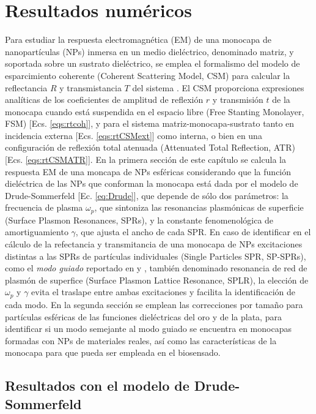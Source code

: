 \chapter{Resultados numéricos}
\label{chapter:Resultados}

Para estudiar la respuesta electromagnética (EM) de una monocapa de nanopartículas (NPs) inmersa en un medio dieléctrico, denominado matriz, y soportada sobre un sustrato dieléctrico, se emplea el formalismo del modelo de esparcimiento coherente (Coherent Scattering Model, CSM) para calcular la reflectancia $R$ y transmistancia $T$ del sistema \cite{reyes2018analytical}. El CSM proporciona expresiones analíticas de los coeficientes de amplitud de reflexión $r$ y transmisión $t$ de la monocapa cuando está suspendida en el espacio libre (Free Stanting Monolayer, FSM) [Ecs. \eqref{eqs:rtcoh}], y para el sistema matriz-monocapa-sustrato tanto en incidencia externa [Ecs. \eqref{eqs:rtCSMext}] como interna, o bien en una configuración de reflexión total atenuada  (Attenuated Total Reflection, ATR) [Ecs. \eqref{eqs:rtCSMATR}]. En la primera sección de este capítulo se calcula la respuesta EM de una moncapa de NPs esféricas considerando que la función dieléctrica de las NPs que conforman la monocapa está dada por el modelo de Drude-Sommerfeld [Ec. \eqref{eq:Drude}], que depende de sólo dos parámetros: la frecuencia de plasma $\omega_p$, que sintoniza las resonancias plasmónicas de superficie (Surface Plasmon Resonances, SPRs), y la constante fenomenológica de amortiguamiento $\gamma$, que ajusta el ancho de cada SPR. En caso de identificar en el cálculo de la refectancia y transmitancia de una monocapa de NPs excitaciones distintas a las  SPRs de partículas individuales (Single Particles SPR, SP-SPRs), como el \emph{modo guiado} reportado en \cite{kabashin2009plasmonic} y \cite{danilov2018ultra}, también denominado resonancia de red de plasmón de superfice (Surface Plasmon Lattice Resonance, SPLR), la elección de $\omega_p$ y $\gamma$ evita el traslape entre ambas excitaciones y facilita la identificación de cada modo. En la segunda sección se emplean las correcciones por tamaño para partículas esféricas de las funciones dieléctricas del oro y de la plata, para identificar si un modo semejante al modo guiado se encuentra en monocapas formadas con NPs de materiales reales, así como las  características de la monocapa para que pueda ser empleada en el biosensado.

\section{Resultados con el modelo de Drude-Sommerfeld}
\label{section:Drude}


